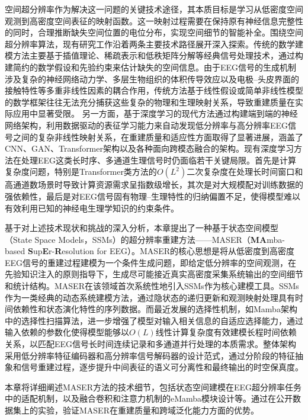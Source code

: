 空间超分辨率作为解决这一问题的关键技术途径，其本质目标是学习从低密度空间观测到高密度空间表征的映射函数。这一映射过程需要在保持原有神经信息完整性的同时，合理推断缺失空间位置的电位分布，实现空间细节的智能补全。围绕空间超分辨率算法，现有研究工作沿着两条主要技术路径展开深入探索。传统的数学建模方法主要基于插值理论、稀疏表示和低秩矩阵分解等经典信号处理技术，通过构建简约的数学假设和先验约束来估计缺失的空间信息\cite{candes2012exact, poon2019multidimensional}。由于EEG信号的生成机制涉及复杂的神经网络动力学、多层生物组织的体积传导效应以及电极--头皮界面的接触特性等多重非线性因素的耦合作用，传统方法基于线性假设或简单非线性模型的数学框架往往无法充分捕获这些复杂的物理和生理映射关系，导致重建质量在实际应用中显著受限\cite{yang2021asre}。
另一方面，基于深度学习的现代方法通过构建端到端的神经网络架构，利用数据驱动的表征学习能力来自动发现低分辨率与高分辨率EEG信号之间的复杂非线性映射关系，在重建质量和适应性方面取得了显著进展，涵盖了CNN\cite{saba2020eeg}、GAN\cite{corley2018deep}、Transformer架构\cite{li2023estformer}以及各种面向跨模态融合的架构\cite{shin2024super, tang2022deep}。现有深度学习方法在处理EEG这类长时序、多通道生理信号时仍面临若干关键局限。首先是计算复杂度问题，特别是Transformer类方法的$O(L^2)$二次复杂度在处理长时间窗口和高通道数场景时导致计算资源需求呈指数级增长，其次是对大规模配对训练数据的强依赖性，最后是对EEG信号固有物理--生理特性的归纳偏置不足，使得模型难以有效利用已知的神经电生理学知识的约束条件。

基于对上述技术现状和挑战的深入分析，本章提出了一种基于状态空间模型（State Space Models，SSMs）的超分辨率重建方法——MASER（\textbf{MA}mba-based \textbf{S}up\textbf{E}r-\textbf{R}esolution for EEG）。MASER的核心思想是将从低密度到高密度EEG信号的重建过程建模为一个条件生成问题，即给定低分辨率的空间观测，在先验知识注入的原则指导下，生成尽可能接近真实高密度采集系统输出的空间细节和统计结构。MASER在该领域首次系统性地引入SSMs作为核心建模工具。SSMs作为一类经典的动态系统建模方法，通过隐状态的递归更新和观测映射处理具有时间依赖性和状态演化特性的序列数据。而最近发展的选择性机制，如Mamba架构中的选择性扫描算法，进一步增强了模型对输入相关信息的自适应选择能力，通过输入依赖的参数化使得模型能够以$O(L)$线性计算复杂度有效建模长程时间依赖关系，以匹配EEG信号长时间连续记录和多通道并行处理的本质需求。整体架构采用低分辨率特征编码器和高分辨率信号解码器的设计范式，通过分阶段的特征抽象和信号重建过程，逐步提升中间表征的语义可分离性和最终输出的时空保真度。

本章将详细阐述MASER方法的技术细节，包括状态空间建模在EEG超分辨率任务中的适配机制，以及融合卷积和注意力机制的eMamba模块设计等。通过在公开数据集上的实验，验证MASER在重建质量和跨域泛化能力方面的优势。

